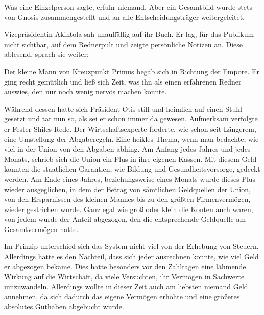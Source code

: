 \par

Was eine Einzelperson sagte, erfuhr niemand.
Aber ein Gesamtbild wurde stets von Gnosis zusammengestellt und an alle Entscheidungsträger weitergeleitet.

\par

Vizepräsidentin Akintola sah unauffällig auf ihr Buch.
Er lag, für das Publikum nicht sichtbar, auf dem Rednerpult und zeigte persönliche Notizen an.
Diese ablesend, sprach sie weiter: 

\par

Der kleine Mann von Kreuzpunkt Primus begab sich in Richtung der Empore.
Er ging recht gemütlich und ließ sich Zeit, was ihn als einen erfahrenen Redner auswies, den nur noch wenig nervös machen konnte.

\par

Während dessen hatte sich Präsident Otis still und heimlich auf einen Stuhl gesetzt und tat nun so, als sei er schon immer da gewesen.
Aufmerksam verfolgte er Fester Shiles Rede.
Der Wirtschaftsexperte forderte, wie schon seit Längerem, eine Umstellung der Abgaberegeln.
Eine heikles Thema, wenn man bedachte, wie viel in der Union von den Abgaben abhing. 
Am Anfang jedes Jahres und jedes Monats, schrieb sich die Union ein Plus in ihre eigenen Kassen.
Mit diesem Geld konnten die staatlichen Garantien, wie Bildung und Gesundheitsvorsorge, gedeckt werden.
Am Ende eines Jahres, beziehungsweise eines Monats wurde dieses Plus wieder ausgeglichen, in dem der Betrag von sämtlichen Geldquellen der Union, von den Ersparnissen des kleinen Mannes bis zu den größten Firmenvermögen, wieder gestrichen wurde.
Ganz egal wie groß oder klein die Konten auch waren, von jedem wurde der Anteil abgezogen, den die entsprechende Geldquelle am Gesamtvermögen hatte.

\par

Im Prinzip unterschied sich das System nicht viel von der Erhebung von Steuern.
Allerdings hatte es den Nachteil, dass sich jeder ausrechnen konnte, wie viel Geld er abgezogen bekäme.
Dies hatte besonders vor den Zahltagen eine lähmende Wirkung auf die Wirtschaft, da viele Versuchten, ihr Vermögen in Sachwerte umzuwandeln.
Allerdings wollte in dieser Zeit auch am liebsten niemand Geld annehmen, da sich dadurch das eigene Vermögen erhöhte und eine größeres absolutes Guthaben abgebucht wurde.

